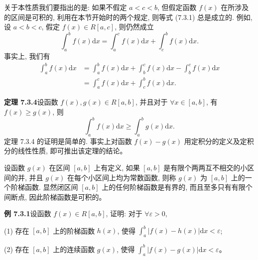 \documentclass[UTF8, 12pt, fontset=fandol, oneside]{ctexart}
\begin{document}
关于本性质我们要指出的是: 如果不假定 $a<c<b$, 但假定函数 $f(x)$ 在所涉及的区间是可积的, 利用在本节开始时的两个规定, 则等式 (7.3.1) 总是成立的. 例如, 设 $a<b<c$, 假定 $f(x)\in R[a,c]$, 则仍然成立
\[
  \int_a^b f(x)\mathrm dx=\int_a^c f(x)\mathrm dx+\int_c^b f(x)\mathrm dx.
\]
事实上, 我们有
\[
\begin{aligned}
  \int_a^b f(x)\mathrm dx
  &=\int_a^b f(x)\mathrm dx+\int_b^c f(x)\mathrm dx-\int_b^c f(x)\mathrm dx\\
  &=\int_a^c f(x)\mathrm dx+\int_c^b f(x)\mathrm dx.
\end{aligned}
\]

\noindent\textbf{定理 7.3.4}\quad 设函数 $f(x),g(x)\in R[a,b]$, 并且对于 $\forall x\in[a,b]$, 有 $f(x)\geq g(x)$, 则
\[
  \int_a^b f(x)\mathrm dx\geq \int_a^b g(x)\mathrm dx.
\]
定理 7.3.4 的证明是简单的. 事实上对函数 $f(x)-g(x)$ 用定积分的定义及定积分的线性性质, 即可推出该定理的结论。

设函数 $g(x)$ 在区间 $[a,b]$ 上有定义, 如果 $[a,b]$ 是有限个两两互不相交的小区间的并, 并且 $g(x)$ 在每个小区间上均为常数函数, 则称 $g(x)$ 为 $[a,b]$ 上的一个阶梯函数. 显然闭区间 $[a,b]$ 上的任何阶梯函数是有界的, 而且至多只有有限个间断点, 因此阶梯函数是可积的。

\noindent\textbf{例 7.3.1}\quad 设函数 $f(x)\in R[a,b]$, 证明: 对于 $\forall\varepsilon>0$,

(1) 存在 $[a,b]$ 上的阶梯函数 $h(x)$, 使得 $\int_a^b |f(x)-h(x)|\mathrm dx<\varepsilon$;

(2) 存在 $[a,b]$ 上的连续函数 $g(x)$, 使得 $\int_a^b |f(x)-g(x)|\mathrm dx<\varepsilon$。
\end{document}
